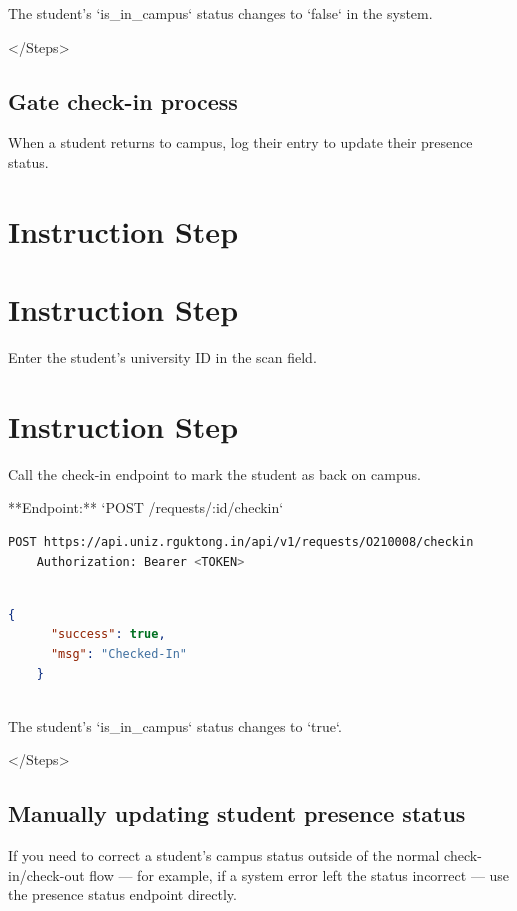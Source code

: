     The student's `is_in_campus` status changes to `false` in the system.

  
</Steps>

\subsection{Gate check-in process}

When a student returns to campus, log their entry to update their presence status.


\section{Instruction Step}

  
\section{Instruction Step}

    Enter the student's university ID in the scan field.
  
  
\section{Instruction Step}

    Call the check-in endpoint to mark the student as back on campus.

    **Endpoint:** `POST /requests/:id/checkin`

    \begin{lstlisting}[language=bash]
    POST https://api.uniz.rguktong.in/api/v1/requests/O210008/checkin
    Authorization: Bearer <TOKEN>
    
\end{lstlisting}

    \begin{lstlisting}[language=json]
    {
      "success": true,
      "msg": "Checked-In"
    }
    
\end{lstlisting}

    The student's `is_in_campus` status changes to `true`.

  
</Steps>

\subsection{Manually updating student presence status}

If you need to correct a student's campus status outside of the normal check-in/check-out flow — for example, if a system error left the status incorrect — use the presence status endpoint directly.

